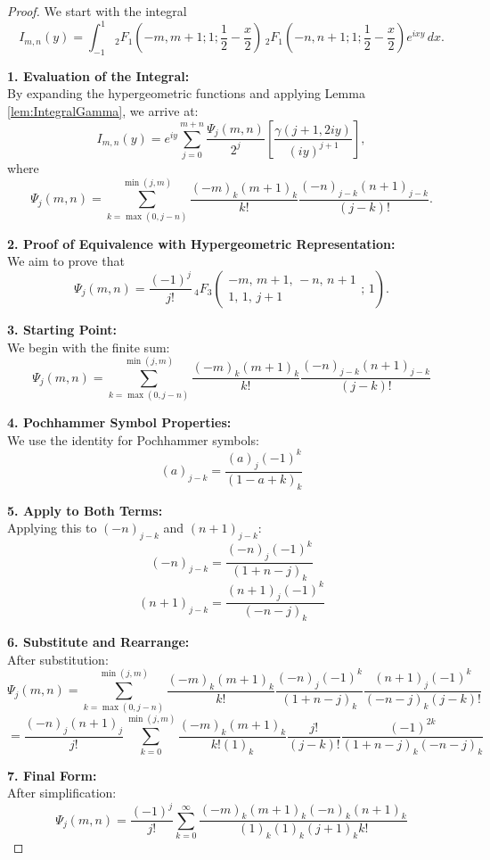 \documentclass[12pt]{article}
\begin{document}
\begin{proof}
We start with the integral
\[
I_{m,n}(y) = \int_{-1}^1 {}_2F_1\left(-m, m+1; 1; \frac{1}{2}-\frac{x}{2}\right)
\, {}_2F_1\left(-n, n+1; 1; \frac{1}{2}-\frac{x}{2}\right) e^{i x y}\, dx.
\]

\textbf{1. Evaluation of the Integral:}\\[1mm]
By expanding the hypergeometric functions and applying Lemma \ref{lem:IntegralGamma}, we arrive at:
\[
I_{m,n}(y) = e^{iy}\sum_{j=0}^{m+n}\frac{\Psi_j(m,n)}{2^j}\left[\frac{\gamma(j+1,2iy)}{(iy)^{j+1}}\right],
\]
where
\[
\Psi_j(m,n)=\sum_{k=\max(0,j-n)}^{\min(j,m)}\frac{(-m)_k(m+1)_k}{k!}\frac{(-n)_{j-k}(n+1)_{j-k}}{(j-k)!}.
\]

\textbf{2. Proof of Equivalence with Hypergeometric Representation:}\\[1mm]
We aim to prove that
\[
\Psi_j(m,n)= \frac{(-1)^j}{j!}\, {}_4F_3\left(
\begin{matrix}
-m,\, m+1,\, -n,\, n+1 \\
1,\, 1,\, j+1
\end{matrix};\, 1\right).
\]

\textbf{3. Starting Point:}\\[1mm]
We begin with the finite sum:
\[
\Psi_j(m,n) = \sum_{k=\max(0,j-n)}^{\min(j,m)} \frac{(-m)_k (m+1)_k}{k!} \frac{(-n)_{j-k} (n+1)_{j-k}}{(j-k)!}
\]

\textbf{4. Pochhammer Symbol Properties:}\\[1mm]
We use the identity for Pochhammer symbols:
\[
(a)_{j-k} = \frac{(a)_j (-1)^k}{(1-a+k)_{k}}
\]

\textbf{5. Apply to Both Terms:}\\[1mm]
Applying this to \( (-n)_{j-k} \) and \( (n+1)_{j-k} \):
\[
(-n)_{j-k} = \frac{(-n)_j (-1)^k}{(1+n-j)_k}
\]
\[
(n+1)_{j-k} = \frac{(n+1)_j (-1)^k}{(-n-j)_k}
\]

\textbf{6. Substitute and Rearrange:}\\[1mm]
After substitution:
\[
\Psi_j(m,n) = \sum_{k=\max(0,j-n)}^{\min(j,m)} \frac{(-m)_k (m+1)_k}{k!} \frac{(-n)_j (-1)^k}{(1+n-j)_k} \frac{(n+1)_j (-1)^k}{(-n-j)_k (j-k)!}
\]
\[
= \frac{(-n)_j(n+1)_j}{j!} \sum_{k=0}^{\min(j,m)} \frac{(-m)_k(m+1)_k}{k!(1)_k} \frac{j!}{(j-k)!} \frac{(-1)^{2k}}{(1+n-j)_k(-n-j)_k}
\]

\textbf{7. Final Form:}\\[1mm]
After simplification:
\[
\Psi_j(m,n) = \frac{(-1)^j}{j!} \sum_{k=0}^{\infty} \frac{(-m)_k(m+1)_k(-n)_k(n+1)_k}{(1)_k(1)_k(j+1)_k k!}
\]


\end{proof}
\end{document}
